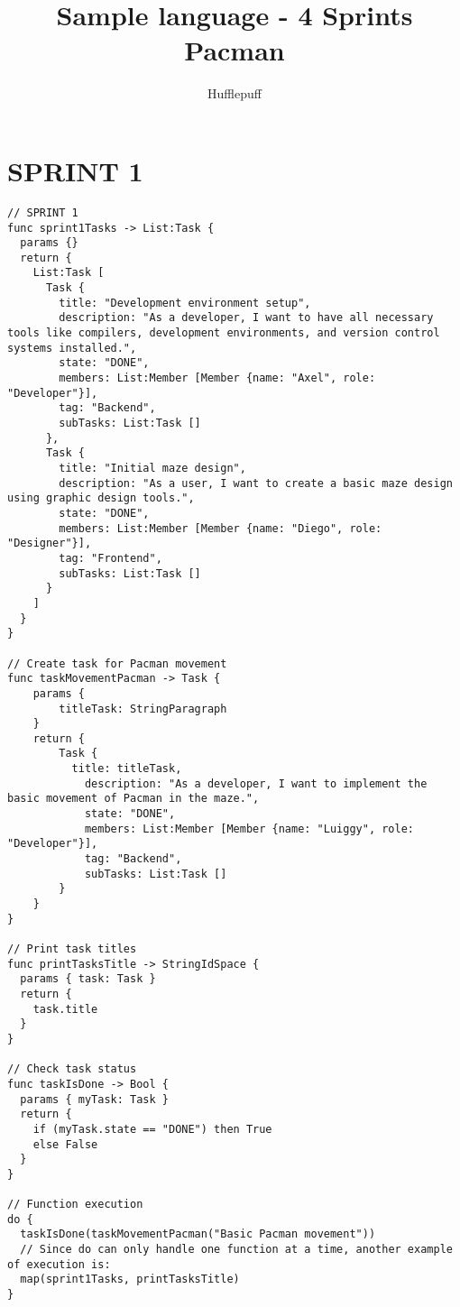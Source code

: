 \documentclass{article}
\title{Sample language - 4 Sprints Pacman}
\author{Hufflepuff}
\begin{document}
\maketitle

\section{SPRINT 1}
\begin{verbatim}
// SPRINT 1
func sprint1Tasks -> List:Task {
  params {}
  return {
    List:Task [
      Task {
        title: "Development environment setup",
        description: "As a developer, I want to have all necessary tools like compilers, development environments, and version control systems installed.",
        state: "DONE",
        members: List:Member [Member {name: "Axel", role: "Developer"}],
        tag: "Backend",
        subTasks: List:Task []
      },
      Task {
        title: "Initial maze design",
        description: "As a user, I want to create a basic maze design using graphic design tools.",
        state: "DONE",
        members: List:Member [Member {name: "Diego", role: "Designer"}],
        tag: "Frontend",
        subTasks: List:Task []
      }
    ]
  }
}

// Create task for Pacman movement
func taskMovementPacman -> Task {
    params {
        titleTask: StringParagraph
    }
    return {
        Task {
          title: titleTask,
	        description: "As a developer, I want to implement the basic movement of Pacman in the maze.",
	        state: "DONE",
	        members: List:Member [Member {name: "Luiggy", role: "Developer"}],
	        tag: "Backend",
	        subTasks: List:Task []
        }
    }
}

// Print task titles
func printTasksTitle -> StringIdSpace {
  params { task: Task }
  return {
    task.title
  }
}

// Check task status
func taskIsDone -> Bool {
  params { myTask: Task }
  return {
    if (myTask.state == "DONE") then True
    else False
  }
}

// Function execution
do {
  taskIsDone(taskMovementPacman("Basic Pacman movement"))
  // Since do can only handle one function at a time, another example of execution is:
  map(sprint1Tasks, printTasksTitle)
}
\end{verbatim}
\end{document}
